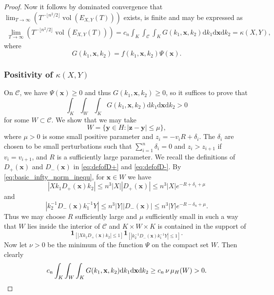\documentclass[10pt,a4paper]{amsart}
\newcommand{\vol}{\operatorname{vol}}
\newcommand{\x}{\mathbf{x}}
\newcommand{\y}{\mathbf{y}}
\begin{document}
\begin{proof}
      Now it follows by dominated convergence  that $\lim_{T \to \infty}  (T^{-\lfloor n^2 / 2 \rfloor} \vol(E_{X,Y}(T)))$ exists, is finite and may be expressed as
      \begin{align*}
          \lim_{T \to \infty}  (T^{-\lfloor n^2 / 2 \rfloor} \vol(E_{X,Y}(T)))  
          =
          c_n
          \int_{K} \int_{\mathcal{C}} \int_{K}
          G(k_1,\x,k_2)
          \mathrm{d} k_1
        \mathrm{d} \x
        \mathrm{d} k_2 
        = \kappa(X,Y),
      \end{align*}
      where 
      \[
      G(k_1,\x,k_2) = f(k_1,\mathbf{x},k_2)\Psi(\x).
      \]

\subsubsection*{Positivity of $\kappa(X,Y)$} 
On $\mathcal{C}$, we have $\Psi(\x) \ge 0$ and thus $G(k_1,\x,k_2) \ge 0$, so it suffices to prove that 
      \[
       \int_{K} \int_{W} \int_{K}
          G(k_1,\x,k_2)
          \mathrm{d} k_1
        \mathrm{d} \x
        \mathrm{d} k_2 > 0
      \]
      for some $W \subset \mathcal{C}$. We show that we may take 
      \[
      W = \{
      \y \in H: | \mathbf{z} - \y | \le \mu
      \}, 
      \]
      where $\mu>0$ is some small positive parameter and
$       z_i = - v_i R + \delta_i.
 $
       The $\delta_i$ are chosen to be small perturbations such that $\sum_{i=1}^n \delta_i =0$ and 
      $z_i > z_{i+1}$ if $v_i = v_{i+1}$, and $R$ is a sufficiently large parameter. 
      We recall the definitions of $D_+(\x)$ and $D_-(\x)$ in \eqref{eq:defofD+} and \eqref{eq:defofD-}. 
      By \eqref{eq:basic_infty_norm_inequ}, for $\x \in W$ we have 
      \[
      | X k_1 D_+(\mathbf{x}) k_2| \le
      n^3 | X|  | D_+(\mathbf{x})| \leq
      n^3 | X| e^{-R + \delta_1 + \mu }
      \]
      and
      \[
      |  k_2^{-1} D_-(\mathbf{x}) k_1^{-1} Y|\le n^3 | Y| |   D_-(\mathbf{x})| \leq  n^3 | Y| e^{-R -\delta_n + \mu}.
      \]
      Thus we may choose $R$ sufficiently large and $\mu$ sufficiently small in such a way that $W$ lies inside the interior of $\mathcal{C}$ and $K \times W \times K$ is contained in the support of 
      \[
      \mathbf{1}_{[| X k_1 D_+(\mathbf{x}) k_2|\le 1]}
      \mathbf{1}_{[|  k_2^{-1} D_-(\mathbf{x}) k_1^{-1} Y|\le 1]}
      .
      \]
      Now let $ \nu >0$ be the minimum of the function $\Psi$ on the compact set $W$. Then clearly 
      \[
      c_n 
       \int_{K} \int_{W} \int_{K}
          G(k_1,\x,k_2)
          \mathrm{d} k_1
        \mathrm{d} \x
        \mathrm{d} k_2 \ge c_n  \, \nu \, \mu_H(  W )>0. \qedhere
      \]
\end{proof}
\end{document}
